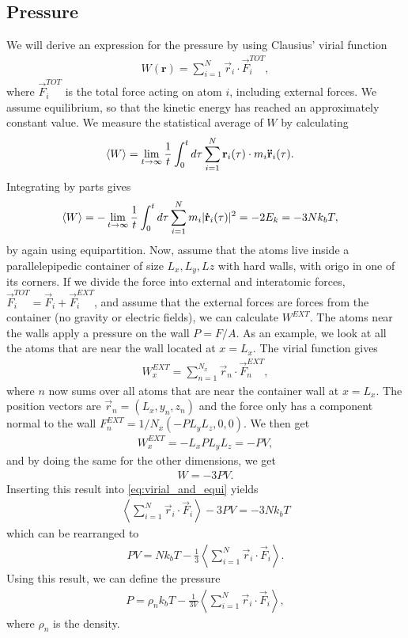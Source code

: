 \subsection{Pressure}
We will derive an expression for the pressure by using Clausius' virial function
\begin{align}
    W(\textbf{r}) = \sum_{i=1}^N \vec r_i \cdot \vec F_i^{TOT},
\end{align}
where $\vec F_i^{TOT}$ is the total force acting on atom $i$, including external forces. We assume equilibrium, so that the kinetic energy has reached an approximately constant value. We measure the statistical average of $W$ by calculating
\begin{align}
    \langle W \rangle &= \lim_{t\rightarrow\infty} {1\over t} \int_0^t d\tau \sum_{i=1}^N \vec r_i(\tau) \cdot m_i \vec{\ddot r}_i(\tau).
\end{align}
Integrating by parts gives
\begin{align}
    \label{eq:virial_and_equi}
    \langle W \rangle &= -\lim_{t\rightarrow\infty} {1\over t} \int_0^t d\tau \sum_{i=1}^N m_i |\vec{\dot r}_i(\tau)|^2 = -2E_k = -3Nk_bT,
\end{align}
by again using equipartition. Now, assume that the atoms live inside a parallelepipedic container of size $L_x, L_y, Lz$ with hard walls, with origo in one of its corners. If we divide the force into external and interatomic forces, $\vec F_i^{TOT} = \vec F_i + \vec F_i^{EXT}$, and assume that the external forces are forces from the container (no gravity or electric fields), we can calculate $W^{EXT}$. The atoms near the walls apply a pressure on the wall $P = F/A$. As an example, we look at all the atoms that are near the wall located at $x=L_x$. The virial function gives
\begin{align}
    W^{EXT}_x = \sum_{n=1}^{N_x}\vec r_n\cdot \vec F_n^{EXT},
\end{align}
where $n$ now sums over all atoms that are near the container wall at $x=L_x$. The position vectors are $\vec r_n = (L_x, y_n, z_n)$ and the force only has a component normal to the wall $F_n^{EXT} = 1/N_x(-PL_yL_z, 0, 0)$. We then get
\begin{align}
    W^{EXT}_x = -L_xPL_yL_z = -PV,
\end{align}
and by doing the same for the other dimensions, we get
\begin{align}
    W = -3PV.
\end{align}
Inserting this result into \eqref{eq:virial_and_equi} yields
\begin{align}
    \left\langle \sum_{i=1}^N \vec r_i \cdot \vec F_i\right\rangle - 3PV = -3Nk_bT
\end{align}
which can be rearranged to
\begin{align}
    PV = Nk_bT - \frac{1}{3}\left\langle \sum_{i=1}^N \vec r_i \cdot \vec F_i\right\rangle.
\end{align}
Using this result, we can define the pressure
\begin{align}
    \label{eq:pressure_in_md}
	P = \rho_n k_bT - \frac{1}{3V}\left\langle \sum_{i=1}^N \vec r_i \cdot \vec F_i\right\rangle,
\end{align}
where $\rho_n$ is the density.
